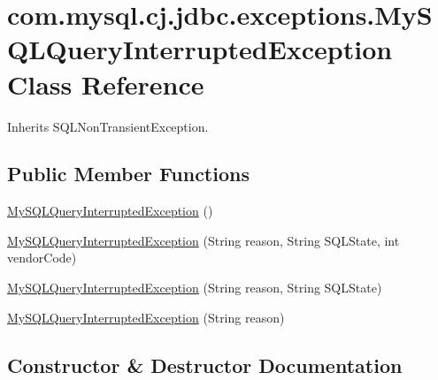 \hypertarget{classcom_1_1mysql_1_1cj_1_1jdbc_1_1exceptions_1_1_my_s_q_l_query_interrupted_exception}{}\section{com.\+mysql.\+cj.\+jdbc.\+exceptions.\+My\+S\+Q\+L\+Query\+Interrupted\+Exception Class Reference}
\label{classcom_1_1mysql_1_1cj_1_1jdbc_1_1exceptions_1_1_my_s_q_l_query_interrupted_exception}


Inherits S\+Q\+L\+Non\+Transient\+Exception.

\subsection*{Public Member Functions}
\begin{DoxyCompactItemize}
\item 
\mbox{\hyperlink{classcom_1_1mysql_1_1cj_1_1jdbc_1_1exceptions_1_1_my_s_q_l_query_interrupted_exception_aa4188f2298194b3f500e3c36c9234bf1}{My\+S\+Q\+L\+Query\+Interrupted\+Exception}} ()
\item 
\mbox{\hyperlink{classcom_1_1mysql_1_1cj_1_1jdbc_1_1exceptions_1_1_my_s_q_l_query_interrupted_exception_a9edfa54b7f9d22a146fda951e4729776}{My\+S\+Q\+L\+Query\+Interrupted\+Exception}} (String reason, String S\+Q\+L\+State, int vendor\+Code)
\item 
\mbox{\hyperlink{classcom_1_1mysql_1_1cj_1_1jdbc_1_1exceptions_1_1_my_s_q_l_query_interrupted_exception_a196666b8454b4d0e206563c119797d84}{My\+S\+Q\+L\+Query\+Interrupted\+Exception}} (String reason, String S\+Q\+L\+State)
\item 
\mbox{\hyperlink{classcom_1_1mysql_1_1cj_1_1jdbc_1_1exceptions_1_1_my_s_q_l_query_interrupted_exception_ad105edbe581390691fb6f0a4b63ecd72}{My\+S\+Q\+L\+Query\+Interrupted\+Exception}} (String reason)
\end{DoxyCompactItemize}


\subsection{Constructor \& Destructor Documentation}
\mbox{\label{classcom_1_1mysql_1_1cj_1_1jdbc_1_1exceptions_1_1_my_s_q_l_query_interrupted_exception_aa4188f2298194b3f500e3c36c9234bf1}} 
